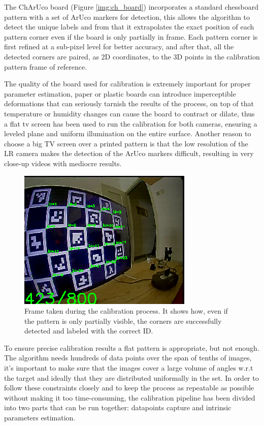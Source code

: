 The ChArUco board (Figure \ref{img:ch_board}) incorporates a standard chessboard pattern with a set of ArUco markers for detection, this allows the algorithm to detect the unique labels and from that it extrapolates the exact position of each pattern corner even if the board is only partially in frame. Each pattern corner is first refined at a sub-pixel level for better accuracy, and after that, all the detected corners are paired, as 2D coordinates, to the 3D points in the calibration pattern frame of reference.

The quality of the board used for calibration is extremely important for proper parameter estimation, paper or plastic boards can introduce imperceptible deformations that can seriously tarnish the results of the process, on top of that temperature or humidity changes can cause the board to contract or dilate, thus a flat tv screen has been used to run the calibration for both cameras, ensuring a leveled plane and uniform illumination on the entire surface. Another reason to choose a big TV screen over a printed pattern is that the low resolution of the LR camera makes the detection of the ArUco markers difficult, resulting in very close-up videos with mediocre results.

\begin{figure}[h]
  \centering
  \includegraphics[scale=0.7]{figures/not_all.png}
  \caption{Frame taken during the calibration process. It shows how, even if the pattern is only partially visible, the corners are successfully detected and labeled with the correct ID.}
  \label{img:ch_calib}
\end{figure}

To ensure precise calibration results a flat pattern is appropriate, but not enough. The algorithm needs hundreds of data points over the span of tenths of images, it's important to make sure that the images cover a large volume of angles w.r.t the target and ideally that they are distributed uniformally in the set. In order to follow these constraints closely and to keep the process as repeatable as possible without making it too time-consuming, the calibration pipeline has been divided into two parts that can be run together: datapoints capture and intrinsic parameters estimation.

